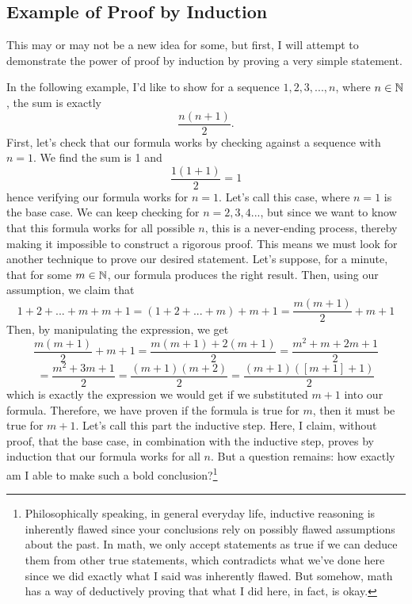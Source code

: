 \subsection{Example of Proof by Induction}
This may or may not be a new idea for some, but first, I will attempt to demonstrate the power of proof by induction by proving a very simple statement.
\begin{ex}
In the following example, I'd like to show for a sequence $1,2,3,...,n$, where $n\in\mathbb{N}$, the sum is exactly
$$\frac{n(n+1)}{2}.$$
First, let's check that our formula works by checking against a sequence with $n=1$. We find the sum is 1 and
$$\frac{1(1+1)}{2}=1$$
hence verifying our formula works for $n=1$. Let's call this case, where $n=1$ is the base case.
We can keep checking for $n=2,3,4...$, but since we want to know that this formula works for all possible $n$, this is a never-ending process, thereby making it impossible to construct a rigorous proof.
This means we must look for another technique to prove our desired statement. Let's suppose, for a minute, that for some $m\in\mathbb{N}$, our formula produces the right result. Then, using our assumption, we claim that
$$1+2+...+m+m+1=(1+2+...+m)+m+1=\frac{m(m+1)}{2}+m+1$$
Then, by manipulating the expression, we get
$$\frac{m(m+1)}{2}+m+1=\frac{m(m+1)+2(m+1)}{2}=\frac{m^2+m+2m+1}{2}$$
$$=\frac{m^2+3m+1}{2}=\frac{(m+1)(m+2)}{2}=\frac{(m+1)([m+1]+1)}{2}$$
which is exactly the expression we would get if we substituted $m+1$ into our formula. Therefore, we have proven if the formula is true for $m$, then it must be true for $m+1$. Let's call this part the inductive step.
Here, I claim, without proof, that the base case, in combination with the inductive step, proves by induction that our formula works for all $n$.
But a question remains: how exactly am I able to make such a bold conclusion?\footnote{
Philosophically speaking, in general everyday life, inductive reasoning is inherently flawed since your conclusions rely on possibly flawed assumptions about the past. 
In math, we only accept statements as true if we can deduce them from other true statements, which contradicts what we've done here since we did exactly what I said was inherently flawed.
But somehow, math has a way of deductively proving that what I did here, in fact, is okay.}
\end{ex}

